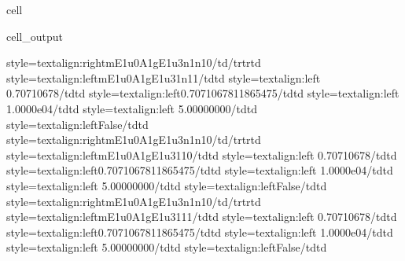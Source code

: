 \documentclass[letterpaper,table,10pt,english]{jupyterBook}
\begin{document}
\begin{sphinxuseclass}{cell}
\begin{sphinxVerbatimOutput}
\begin{sphinxuseclass}{cell_output}
\begin{sphinxVerbatim}[commandchars=\\\{\}]
style=\PYGZbs{}\PYGZsq{}text\PYGZhy{}align:right\PYGZbs{}\PYGZsq{}\PYGZgt{}m\PYGZus{}E1u\PYGZus{}0\PYGZus{}A1g\PYGZus{}E1u\PYGZus{}3\PYGZus{}n1\PYGZus{}n1\PYGZus{}0\PYGZlt{}/td\PYGZgt{}\PYGZlt{}/tr\PYGZgt{}\PYGZlt{}tr\PYGZgt{}\PYGZlt{}td style=\PYGZbs{}\PYGZsq{}text\PYGZhy{}align:left\PYGZbs{}\PYGZsq{}\PYGZgt{}m\PYGZus{}E1u\PYGZus{}0\PYGZus{}A1g\PYGZus{}E1u\PYGZus{}3\PYGZus{}1\PYGZus{}n1\PYGZus{}1\PYGZlt{}/td\PYGZgt{}\PYGZlt{}td style=\PYGZbs{}\PYGZsq{}text\PYGZhy{}align:left\PYGZbs{}\PYGZsq{}\PYGZgt{} 0.70710678\PYGZlt{}/td\PYGZgt{}\PYGZlt{}td style=\PYGZbs{}\PYGZsq{}text\PYGZhy{}align:left\PYGZbs{}\PYGZsq{}\PYGZgt{}0.7071067811865475\PYGZlt{}/td\PYGZgt{}\PYGZlt{}td style=\PYGZbs{}\PYGZsq{}text\PYGZhy{}align:left\PYGZbs{}\PYGZsq{}\PYGZgt{} 1.0000e\PYGZhy{}04\PYGZlt{}/td\PYGZgt{}\PYGZlt{}td style=\PYGZbs{}\PYGZsq{}text\PYGZhy{}align:left\PYGZbs{}\PYGZsq{}\PYGZgt{} 5.00000000\PYGZlt{}/td\PYGZgt{}\PYGZlt{}td style=\PYGZbs{}\PYGZsq{}text\PYGZhy{}align:left\PYGZbs{}\PYGZsq{}\PYGZgt{}False\PYGZlt{}/td\PYGZgt{}\PYGZlt{}td style=\PYGZbs{}\PYGZsq{}text\PYGZhy{}align:right\PYGZbs{}\PYGZsq{}\PYGZgt{}m\PYGZus{}E1u\PYGZus{}0\PYGZus{}A1g\PYGZus{}E1u\PYGZus{}3\PYGZus{}n1\PYGZus{}n1\PYGZus{}0\PYGZlt{}/td\PYGZgt{}\PYGZlt{}/tr\PYGZgt{}\PYGZlt{}tr\PYGZgt{}\PYGZlt{}td style=\PYGZbs{}\PYGZsq{}text\PYGZhy{}align:left\PYGZbs{}\PYGZsq{}\PYGZgt{}m\PYGZus{}E1u\PYGZus{}0\PYGZus{}A1g\PYGZus{}E1u\PYGZus{}3\PYGZus{}1\PYGZus{}1\PYGZus{}0\PYGZlt{}/td\PYGZgt{}\PYGZlt{}td style=\PYGZbs{}\PYGZsq{}text\PYGZhy{}align:left\PYGZbs{}\PYGZsq{}\PYGZgt{} 0.70710678\PYGZlt{}/td\PYGZgt{}\PYGZlt{}td style=\PYGZbs{}\PYGZsq{}text\PYGZhy{}align:left\PYGZbs{}\PYGZsq{}\PYGZgt{}0.7071067811865475\PYGZlt{}/td\PYGZgt{}\PYGZlt{}td style=\PYGZbs{}\PYGZsq{}text\PYGZhy{}align:left\PYGZbs{}\PYGZsq{}\PYGZgt{} 1.0000e\PYGZhy{}04\PYGZlt{}/td\PYGZgt{}\PYGZlt{}td style=\PYGZbs{}\PYGZsq{}text\PYGZhy{}align:left\PYGZbs{}\PYGZsq{}\PYGZgt{} 5.00000000\PYGZlt{}/td\PYGZgt{}\PYGZlt{}td style=\PYGZbs{}\PYGZsq{}text\PYGZhy{}align:left\PYGZbs{}\PYGZsq{}\PYGZgt{}False\PYGZlt{}/td\PYGZgt{}\PYGZlt{}td style=\PYGZbs{}\PYGZsq{}text\PYGZhy{}align:right\PYGZbs{}\PYGZsq{}\PYGZgt{}m\PYGZus{}E1u\PYGZus{}0\PYGZus{}A1g\PYGZus{}E1u\PYGZus{}3\PYGZus{}n1\PYGZus{}n1\PYGZus{}0\PYGZlt{}/td\PYGZgt{}\PYGZlt{}/tr\PYGZgt{}\PYGZlt{}tr\PYGZgt{}\PYGZlt{}td style=\PYGZbs{}\PYGZsq{}text\PYGZhy{}align:left\PYGZbs{}\PYGZsq{}\PYGZgt{}m\PYGZus{}E1u\PYGZus{}0\PYGZus{}A1g\PYGZus{}E1u\PYGZus{}3\PYGZus{}1\PYGZus{}1\PYGZus{}1\PYGZlt{}/td\PYGZgt{}\PYGZlt{}td style=\PYGZbs{}\PYGZsq{}text\PYGZhy{}align:left\PYGZbs{}\PYGZsq{}\PYGZgt{} 0.70710678\PYGZlt{}/td\PYGZgt{}\PYGZlt{}td style=\PYGZbs{}\PYGZsq{}text\PYGZhy{}align:left\PYGZbs{}\PYGZsq{}\PYGZgt{}0.7071067811865475\PYGZlt{}/td\PYGZgt{}\PYGZlt{}td style=\PYGZbs{}\PYGZsq{}text\PYGZhy{}align:left\PYGZbs{}\PYGZsq{}\PYGZgt{} 1.0000e\PYGZhy{}04\PYGZlt{}/td\PYGZgt{}\PYGZlt{}td style=\PYGZbs{}\PYGZsq{}text\PYGZhy{}align:left\PYGZbs{}\PYGZsq{}\PYGZgt{} 5.00000000\PYGZlt{}/td\PYGZgt{}\PYGZlt{}td style=\PYGZbs{}\PYGZsq{}text\PYGZhy{}align:left\PYGZbs{}\PYGZsq{}\PYGZgt{}False\PYGZlt{}/td\PYGZgt{}\PYGZlt{}td 
\end{sphinxVerbatim}
\end{sphinxuseclass}
\end{sphinxVerbatimOutput}
\end{sphinxuseclass}
\end{document}
